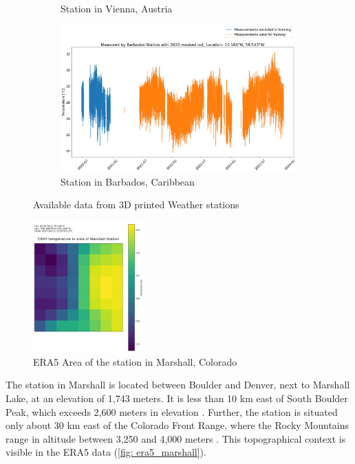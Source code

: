 \begin{figure}
\begin{subfigure}{0.672\textwidth}
\caption{Station in Vienna, Austria}
\label{fig: available_measurements_vienna}
\end{subfigure}
\begin{subfigure}{0.672\textwidth}
\includegraphics[width=\textwidth]{resources/images/charts/barbados_available_measurements.png}
\caption{Station in Barbados, Caribbean}
\label{fig: available_measurements_barbados}
\end{subfigure}
\caption{Available data from 3D printed Weather stations}
\label{fig: weather_stations}
\end{figure}

\begin{figure}
\centering
\includegraphics[width=0.38\textwidth]{resources/images/Marshall_era5.png}
\caption{ERA5 Area of the station in Marshall, Colorado}
\label{fig: era5_marshall}
\end{figure}

The station in Marshall is located between Boulder and Denver, next to Marshall Lake, at an elevation of 1,743 meters. It is less than 10 km east of South Boulder Peak, which exceeds 2,600 meters in elevation \cite{southboulderpeak}.
Further, the station is situated only about 30 km east of the Colorado Front Range, where the Rocky Mountains range in altitude between 3,250 and 4,000 meters \cite{Williams1996}.
This topographical context is visible in the ERA5 data (\autoref{fig: era5_marshall}).

